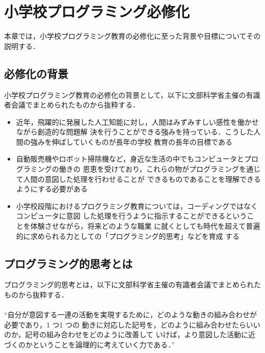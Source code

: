 \newpage

\section{\rm 小学校プログラミング必修化}
本章では，小学校プログラミング教育の必修化に至った背景や目標についてその説明する．

\subsection{必修化の背景}
小学校プログラミング教育の必修化の背景として，以下に文部科学省主催の有識者会議でまとめられたものから抜粋する．


\begin{itemize}
 \item 近年，飛躍的に発展した人工知能に対し，人間はみずみすしい感性を働かせながら創造的な問題解
決を行うことができる強みを持っている．こうした人間の強みを伸ばしていくものが長年の学校
教育の長年の目標である\\

 \item 自動販売機やロボット掃除機など，身近な生活の中でもコンピュータとプログラミングの働きの
恩恵を受けており，これらの物がプログラミングを通じて人間の意図した処理を行わせることが
できるものであることを理解できるようにする必要がある\\

 \item 小学校段階におけるプログラミング教育については，コーディングではなくコンピュータに意図
した処理を行うように指示することができるということを体験させながら，将来どのような職業
に就くとしても時代を超えて普遍的に求められる力としての「プログラミング的思考」などを育成
する
\end{itemize}

\subsection{プログラミング的思考とは}
プログラミング的思考とは，以下に文部科学省主催の有識者会議でまとめられたものから抜粋する．
\\
\\
``自分が意図する一連の活動を実現するために，どのような動きの組み合わせが必要であり，1 つ1 つの
動きに対応した記号を，どのように組み合わせたらいいのか，記号の組み合わせをどのように改善して
いけば，より意図した活動に近づくのかということを論理的に考えていく力である．''



